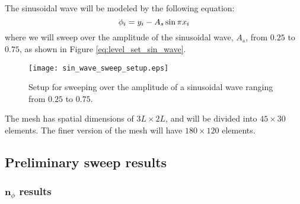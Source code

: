 The sinusoidal wave will be modeled by the following equation:
%
\begin{equation}
	\centering
	\label{eq:level_set_sin_wave}
	\phi_{i} = y_{i} - A_{s} \sin \pi x_{i}
\end{equation}
%
where we will sweep over the amplitude of the sinusoidal wave, $A_{s}$, from $0.25$ to $0.75$, as shown in Figure \ref{eq:level_set_sin_wave}.
%
\begin{figure}[H]
	\centering
	\texttt{[image: sin\_wave\_sweep\_setup.eps]}
	\caption{Setup for sweeping over the amplitude of a sinusoidal wave ranging from $0.25$ to $0.75$.}
	\label{fig:sin_wave_sweep_setup}
\end{figure}
%
The mesh has spatial dimensions of $3L \times 2L$, and will be divided into $45 \times 30$ elements. The finer version of the mesh will have $180 \times 120$ elements.


\subsection{Preliminary sweep results}
\label{sec:sweep_results}


\subsubsection{$\mathbf{n}_{\phi}$ results}
\label{sec:nphi_results}

